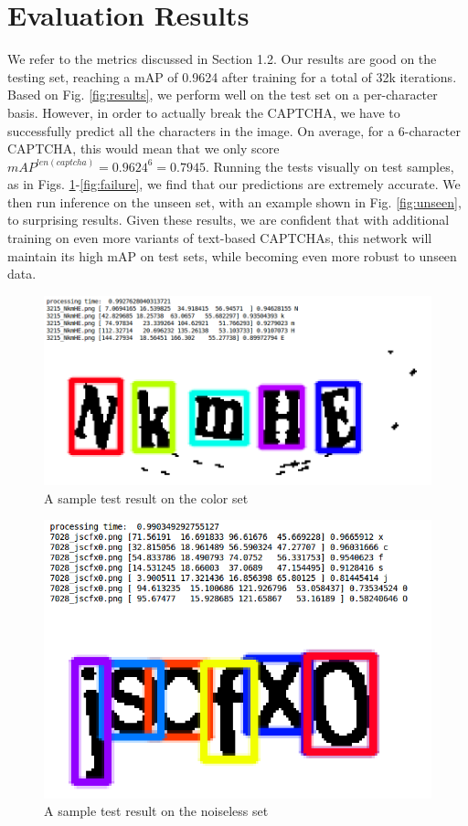 \documentclass[twocolumn,10pt]{article}
\begin{document}
\section{Evaluation Results}
We refer to the metrics discussed in Section 1.2. Our results are good on the testing set, reaching a mAP of 0.9624 after training for a total of 32k iterations. Based on Fig. \ref{fig:results}, we perform well on the test set on a per-character basis. However, in order to actually break the CAPTCHA, we have to successfully predict all the characters in the image. On average, for a 6-character CAPTCHA, this would mean that we only score $mAP^{len(captcha)} = 0.9624^6 = 0.7945$. Running the tests visually on test samples, as in Figs. \ref{fig:sample1}-\ref{fig:failure}, we find that our predictions are extremely accurate. We then run inference on the unseen set, with an example shown in Fig. \ref{fig:unseen}, to surprising results. Given these results, we are confident that with additional training on even more variants of text-based CAPTCHAs, this network will maintain its high mAP on test sets, while becoming even more robust to unseen data.

\begin{figure}
  \centering
  \includegraphics[width=\linewidth]{resultscolor.png}
  \caption{A sample test result on the color set}
  \label{fig:sample1}
\end{figure}

\begin{figure}
  \centering
  \includegraphics[width=.8\linewidth]{resultsnoiseless.png}
  \caption{A sample test result on the noiseless set}
  \label{fig:sample2}
\end{figure}
\end{document}
